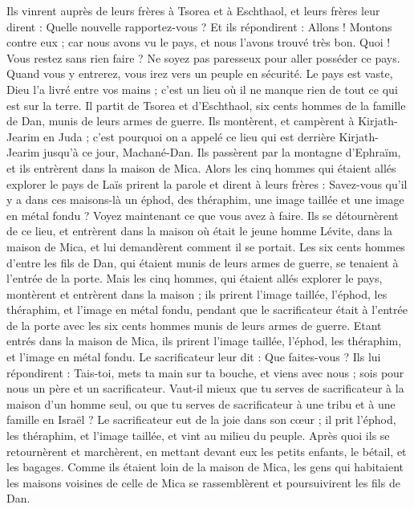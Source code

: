 \begin{multicols}{2}
Ils vinrent auprès de leurs frères à Tsorea et à Eschthaol, et leurs frères leur dirent : Quelle nouvelle rapportez-vous ?
Et ils répondirent : Allons ! Montons contre eux ; car nous avons vu le pays, et nous l'avons trouvé très bon. Quoi ! Vous restez sans rien faire ? Ne soyez pas paresseux pour aller posséder ce pays.
Quand vous y entrerez, vous irez vers un peuple en sécurité. Le pays est vaste, Dieu l'a livré entre vos mains ; c'est un lieu où il ne manque rien de tout ce qui est sur la terre.
Il partit de Tsorea et d'Eschthaol, six cents hommes de la famille de Dan, munis de leurs armes de guerre.
Ils montèrent, et campèrent à Kirjath-Jearim en Juda ; c'est pourquoi on a appelé ce lieu qui est derrière Kirjath-Jearim jusqu'à ce jour, Machané-Dan.
Ils passèrent par la montagne d'Ephraïm, et ils entrèrent dans la maison de Mica.
Alors les cinq hommes qui étaient allés explorer le pays de Laïs prirent la parole et dirent à leurs frères : Savez-vous qu'il y a dans ces maisons-là un éphod, des théraphim, une image taillée et une image en métal fondu ? Voyez maintenant ce que vous avez à faire.
Ils se détournèrent de ce lieu, et entrèrent dans la maison où était le jeune homme Lévite, dans la maison de Mica, et lui demandèrent comment il se portait.
Les six cents hommes d'entre les fils de Dan, qui étaient munis de leurs armes de guerre, se tenaient à l'entrée de la porte.
Mais les cinq hommes, qui étaient allés explorer le pays, montèrent et entrèrent dans la maison ; ils prirent l'image taillée, l'éphod, les théraphim, et l'image en métal fondu, pendant que le sacrificateur était à l'entrée de la porte avec les six cents hommes munis de leurs armes de guerre.
Etant entrés dans la maison de Mica, ils prirent l'image taillée, l'éphod, les théraphim, et l'image en métal fondu. Le sacrificateur leur dit : Que faites-vous ?
Ils lui répondirent : Tais-toi, mets ta main sur ta bouche, et viens avec nous ; sois pour nous un père et un sacrificateur. Vaut-il mieux que tu serves de sacrificateur à la maison d'un homme seul, ou que tu serves de sacrificateur à une tribu et à une famille en Israël ?
Le sacrificateur eut de la joie dans son cœur ; il prit l'éphod, les théraphim, et l'image taillée, et vint au milieu du peuple.
Après quoi ils se retournèrent et marchèrent, en mettant devant eux les petits enfants, le bétail, et les bagages.
Comme ils étaient loin de la maison de Mica, les gens qui  habitaient les maisons voisines de celle de Mica se rassemblèrent et poursuivirent les fils de Dan.

\end{multicols}
